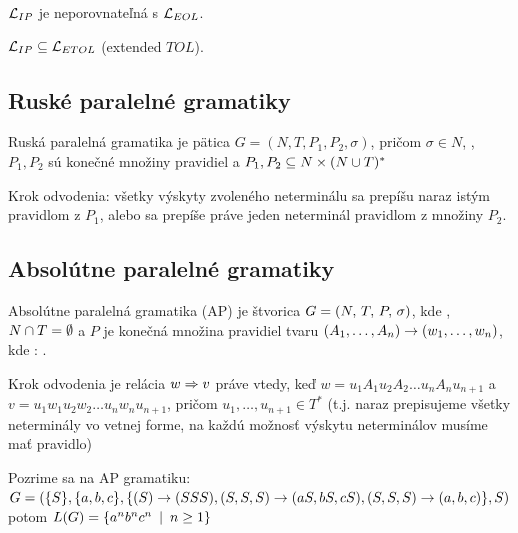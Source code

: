 \begin{veta}
  $\mathcal{L}_{IP}$ je neporovnateľná s $\mathcal{L}_{EOL}$.
\end{veta}

\begin{veta}
  $\mathcal{L}_{IP} \subseteq \mathcal{L}_{ETOL}$ (extended $TOL$).
\end{veta}

\subsection{Ruské paralelné gramatiky}

\begin{definicia}
  Ruská paralelná gramatika je pätica $G = (N, T, P_1, P_2, \sigma)$,
  pričom $\sigma \in N$, ,
  $P_1, P_2$ sú konečné množiny pravidiel a
  $P_1,P_2 \subseteq N \times (N \cup T)^{*}$
\end{definicia}

\begin{definicia}
  Krok odvodenia: všetky výskyty zvoleného neterminálu sa prepíšu
  naraz istým pravidlom z $P_1$, alebo sa prepíše práve jeden
  neterminál pravidlom z množiny $P_2$.
\end{definicia}

\subsection{Absolútne paralelné gramatiky}

\begin{definicia}
  Absolútne paralelná gramatika (AP) je štvorica
  $G = (N,\,T,\,P,\,\sigma)$,
  kde , $N \cap T = \emptyset$
  a $P$ je konečná množina pravidiel tvaru
  $(A_1,\dots,A_n) \rightarrow (w_1, \dots, w_n)$, kde
  : .
\end{definicia}

\begin{definicia}
  Krok odvodenia je relácia $w\Rightarrow v$ práve vtedy, keď
  $w = u_1 A_1 u_2 A_2 \dots u_n A_n u_{n+1}$ a
  $v = u_1 w_1 u_2 w_2 \dots u_n w_n u_{n+1}$, pričom
  $u_1, \dots, u_{n+1} \in T^{*}$ (t.j. naraz prepisujeme všetky
  neterminály vo vetnej forme, na každú možnosť výskytu neterminálov
  musíme mať pravidlo)
\end{definicia}

\begin{priklad}
  Pozrime sa na AP gramatiku:\\
  $G = (\{S\}, \{a,b,c\},
        \{(S) \rightarrow (SSS),
          (S,S,S)\rightarrow (aS,bS,cS),
          (S,S,S)\rightarrow(a,b,c)
          \}, S)$
  potom $L(G) = \{a^n b^n c^n \enspace |\enspace n \ge 1\}$
\end{priklad}

